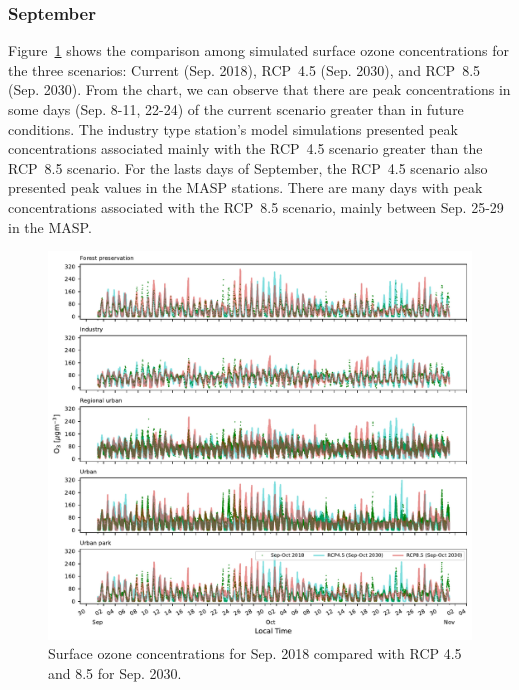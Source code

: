 \subsubsection{September}
Figure~\ref{fig:o3_changes} shows the comparison among simulated surface ozone concentrations for the three scenarios: Current (Sep. 2018), RCP~4.5 (Sep. 2030), and RCP~8.5 (Sep. 2030).
From the chart, we can observe that there are peak concentrations in some days (Sep. 8-11, 22-24) of the current scenario greater than in future conditions.
The industry type station's model simulations presented peak concentrations associated mainly with the RCP~4.5 scenario greater than the RCP~8.5 scenario.
For the lasts days of September, the RCP~4.5 scenario also presented peak values in the MASP stations.
There are many days with peak concentrations associated with the RCP~8.5 scenario, mainly between Sep. 25-29 in the MASP.

\begin{figure}[!hbt]
\begin{center}
  \includegraphics[width=1.05\textwidth]{fig/rcp_2030_subplot_o3}
\end{center}
  \caption{Surface ozone concentrations for Sep. 2018 compared with RCP 4.5 and 8.5 for Sep. 2030.}
  \label{fig:o3_changes}
\end{figure}

